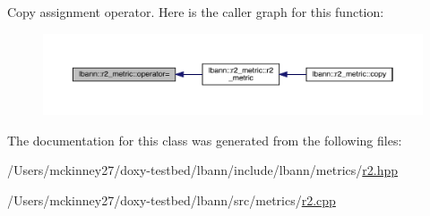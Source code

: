 Copy assignment operator. Here is the caller graph for this function\+:\nopagebreak
\begin{figure}[H]
\begin{center}
\leavevmode
\includegraphics[width=350pt]{classlbann_1_1r2__metric_a83078b4784031fc91f7f145cf22e5571_icgraph}
\end{center}
\end{figure}


The documentation for this class was generated from the following files\+:\begin{DoxyCompactItemize}
\item 
/\+Users/mckinney27/doxy-\/testbed/lbann/include/lbann/metrics/\hyperlink{r2_8hpp}{r2.\+hpp}\item 
/\+Users/mckinney27/doxy-\/testbed/lbann/src/metrics/\hyperlink{r2_8cpp}{r2.\+cpp}\end{DoxyCompactItemize}
